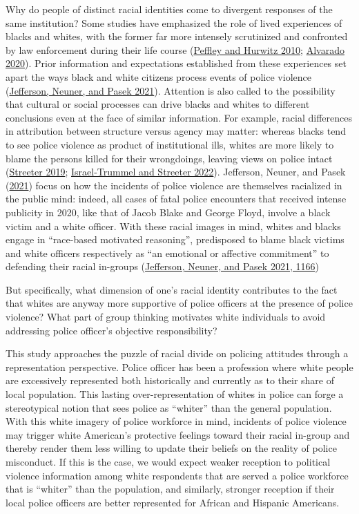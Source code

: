 \documentclass[
  12pt,
]{article}
\begin{document}
Why do people of distinct racial identities come to divergent responses
of the same institution? Some studies have emphasized the role of lived
experiences of blacks and whites, with the former far more intensely
scrutinized and confronted by law enforcement during their life course
(\protect\hyperlink{ref-peffley2010}{Peffley and Hurwitz 2010};
\protect\hyperlink{ref-alvarado2020}{Alvarado 2020}). Prior information
and expectations established from these experiences set apart the ways
black and white citizens process events of police violence
(\protect\hyperlink{ref-jefferson2021}{Jefferson, Neuner, and Pasek
2021}). Attention is also called to the possibility that cultural or
social processes can drive blacks and whites to different conclusions
even at the face of similar information. For example, racial differences
in attribution between structure versus agency may matter: whereas
blacks tend to see police violence as product of institutional ills,
whites are more likely to blame the persons killed for their
wrongdoings, leaving views on police intact
(\protect\hyperlink{ref-streeter2019}{Streeter 2019};
\protect\hyperlink{ref-israel-trummel2022}{Israel-Trummel and Streeter
2022}). Jefferson, Neuner, and Pasek
(\protect\hyperlink{ref-jefferson2021}{2021}) focus on how the incidents
of police violence are themselves racialized in the public mind: indeed,
all cases of fatal police encounters that received intense publicity in
2020, like that of Jacob Blake and George Floyd, involve a black victim
and a white officer. With these racial images in mind, whites and blacks
engage in ``race-based motivated reasoning'', predisposed to blame black
victims and white officers respectively as ``an emotional or affective
commitment'' to defending their racial in-groups
(\protect\hyperlink{ref-jefferson2021}{Jefferson, Neuner, and Pasek
2021, 1166})

But specifically, what dimension of one's racial identity contributes to
the fact that whites are anyway more supportive of police officers at
the presence of police violence? What part of group thinking motivates
white individuals to avoid addressing police officer's objective
responsibility?

This study approaches the puzzle of racial divide on policing attitudes
through a representation perspective. Police officer has been a
profession where white people are excessively represented both
historically and currently as to their share of local population. This
lasting over-representation of whites in police can forge a
stereotypical notion that sees police as ``whiter'' than the general
population. With this white imagery of police workforce in mind,
incidents of police violence may trigger white American's protective
feelings toward their racial in-group and thereby render them less
willing to update their beliefs on the reality of police misconduct. If
this is the case, we would expect weaker reception to political violence
information among white respondents that are served a police workforce
that is ``whiter'' than the population, and similarly, stronger
reception if their local police officers are better represented for
African and Hispanic Americans.
\end{document}

